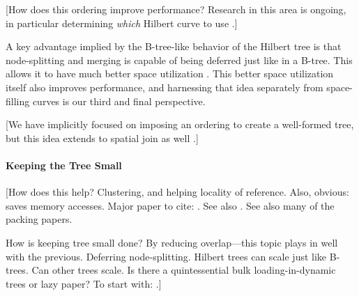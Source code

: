 [How does this ordering improve performance?
Research in this area is ongoing, in particular determining \emph{which} Hilbert curve to use \cite{haverkortwalderveen11}.]

A key advantage implied by the B-tree-like behavior of the Hilbert tree is that node-splitting and merging is capable of being deferred just like in a B-tree.
This allows it to have much better space utilization \cite{kamelfaloutsos94}.
This better space utilization itself also improves performance, and harnessing that idea separately from space-filling curves is our third and final perspective.

[We have implicitly focused on imposing an ordering to create a well-formed tree, but this idea extends to spatial join as well \cite{jacoxsamet07}.]

\paragraph{Keeping the Tree Small}
[How does this help?
Clustering, and helping locality of reference.
Also, obvious: saves memory accesses.
Major paper to cite: \cite{huanglinlin01}.
See also \cite{zhanglucheng06}.
See also many of the packing papers.

How is keeping tree small done?
By reducing overlap---this topic plays in well with the previous.
Deferring node-splitting.
Hilbert trees can scale just like B-trees.
Can other trees scale.
Is there a quintessential bulk loading-in-dynamic trees or lazy paper?
To start with: \cite{argehinrichsvahrenholdvitter99}.]


